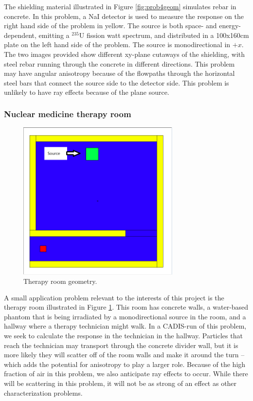 The shielding material illustrated in Figure \ref{fig:prob4geom} simulates rebar in concrete. In this problem, a NaI detector is
used to measure the response on the right hand side of the problem in yellow.
The source is both space- and energy-dependent, emitting a $^{235}$U  fission watt spectrum, and distributed in a 100x160cm plate
on the left hand side of the problem. The source is monodirectional in $+x$.
The two images provided show
different xy-plane cutaways of the shielding, with steel rebar running through
the concrete in different directions. This problem may have angular
anisotropy because of the flowpaths through the horizontal steel bars that connect
the source side to the detector side. 
 This problem 
is unlikely to have ray effects because of the plane source.

\subsubsection*{Nuclear medicine therapy room}

\begin{figure}[h!]
  \centering
  \includegraphics[height=8cm]{./chapters/characterization_probs/figures/geometries/therapy-room.png}
  \caption[Nuclear medicine therapy room.]{Therapy room geometry.}
  \label{fig:therapygeom}
\end{figure}

A small application problem relevant to the interests of this project is the
therapy room illustrated in Figure \ref{fig:therapygeom}. This room has concrete
walls, a water-based phantom that is being irradiated by a monodirectional
source in the room, and a hallway where a therapy technician might walk. In a
CADIS-run of this problem, we seek to calculate the response in the
technician in the hallway.  Particles that
reach the technician may transport through the concrete divider wall, but it is more likely they will
scatter off of the room walls and make it around the turn -- which adds the potential for anisotropy to play a larger role. Because of the high fraction of air in this problem, we also anticipate
ray effects to occur. While there will be scattering in this problem, it will
not be as strong of an effect as other characterization problems.

